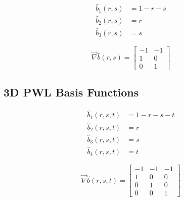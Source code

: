 \begin{equation}
\label{eq::App_BF_2D_triref}
\begin{aligned}
	\hat{b}_1(r,s) & = 1-r-s \\
	\hat{b}_2(r,s) & = r \\
	\hat{b}_3(r,s) & = s 
\end{aligned}
\end{equation}

\begin{equation}
\label{eq::App_BF_2D_triref_grad}
\vec{\nabla} \hat{b} (r,s)  = 
\left[
\begin{array}{cc}
-1 & -1 \\
1 & 0 \\
0 & 1
\end{array}
\right]
\end{equation}

\subsection{3D PWL Basis Functions}
\label{sec::appendix_BF_PWLInt_3D}



\begin{equation}
\label{eq::3D_tetref_BF}
\begin{aligned}
	\hat{b}_1(r,s,t) & = 1-r-s-t \\
	\hat{b}_2(r,s,t) & = r \\
	\hat{b}_3(r,s,t) & = s \\
	\hat{b}_4(r,s,t) & = t
\end{aligned}
\end{equation}

\begin{equation}
\label{eq::App_BF_3D_tetref_grad}
\vec{\nabla} \hat{b} (r,s,t)  = 
\left[
\begin{array}{ccc}
-1 & -1 & -1 \\
1 & 0 & 0 \\
0 & 1 & 0 \\
0 & 0 & 1
\end{array}
\right]
\end{equation}
